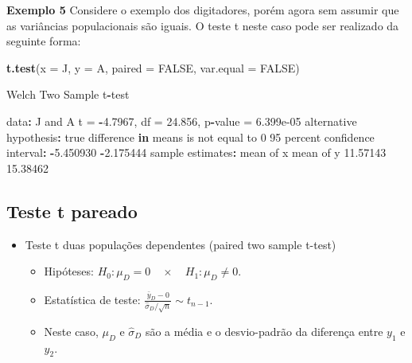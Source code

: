 \documentclass[10pt,a4paper]{book}
\newenvironment{Shaded}{\begin{snugshade}}{\end{snugshade}}
\newcommand{\KeywordTok}[1]{\textcolor[rgb]{0.13,0.29,0.53}{\textbf{#1}}}
\newcommand{\DataTypeTok}[1]{\textcolor[rgb]{0.13,0.29,0.53}{#1}}
\newcommand{\DecValTok}[1]{\textcolor[rgb]{0.00,0.00,0.81}{#1}}
\newcommand{\FloatTok}[1]{\textcolor[rgb]{0.00,0.00,0.81}{#1}}
\newcommand{\StringTok}[1]{\textcolor[rgb]{0.31,0.60,0.02}{#1}}
\newcommand{\OtherTok}[1]{\textcolor[rgb]{0.56,0.35,0.01}{#1}}
\newcommand{\ControlFlowTok}[1]{\textcolor[rgb]{0.13,0.29,0.53}{\textbf{#1}}}
\newcommand{\OperatorTok}[1]{\textcolor[rgb]{0.81,0.36,0.00}{\textbf{#1}}}
\newcommand{\NormalTok}[1]{#1}
\providecommand{\tightlist}{%
  \setlength{\itemsep}{0pt}\setlength{\parskip}{0pt}}
\begin{document}
\textbf{Exemplo 5} Considere o exemplo dos digitadores, porém agora sem
assumir que as variâncias populacionais são iguais. O teste t neste caso
pode ser realizado da seguinte forma:

\begin{Shaded}
\begin{Highlighting}[]
\KeywordTok{t.test}\NormalTok{(}\DataTypeTok{x =}\NormalTok{ J, }\DataTypeTok{y =}\NormalTok{ A, }\DataTypeTok{paired =} \OtherTok{FALSE}\NormalTok{, }\DataTypeTok{var.equal =} \OtherTok{FALSE}\NormalTok{)}

\NormalTok{    Welch Two Sample t}\OperatorTok{-}\NormalTok{test}

\NormalTok{data}\OperatorTok{:}\StringTok{  }\NormalTok{J and A}
\NormalTok{t =}\StringTok{ }\OperatorTok{-}\FloatTok{4.7967}\NormalTok{, df =}\StringTok{ }\FloatTok{24.856}\NormalTok{, p}\OperatorTok{-}\NormalTok{value =}\StringTok{ }\FloatTok{6.399e-05}
\NormalTok{alternative hypothesis}\OperatorTok{:}\StringTok{ }\NormalTok{true difference }\ControlFlowTok{in}\NormalTok{ means is not equal to }\DecValTok{0}
\DecValTok{95}\NormalTok{ percent confidence interval}\OperatorTok{:}
\StringTok{ }\OperatorTok{-}\FloatTok{5.450930} \OperatorTok{-}\FloatTok{2.175444}
\NormalTok{sample estimates}\OperatorTok{:}
\NormalTok{mean of x mean of y }
 \FloatTok{11.57143}  \FloatTok{15.38462} 
\end{Highlighting}
\end{Shaded}

\subsection{Teste t pareado}\label{teste-t-pareado}

\begin{itemize}
\tightlist
\item
  Teste t duas populações dependentes (paired two sample t-test)

  \begin{itemize}
  \tightlist
  \item
    Hipóteses: \(H_0: \mu_D = 0 \quad \times \quad H_1: \mu_D \neq 0.\)
  \item
    Estatística de teste:
    \(\frac{\bar{y}_D - 0}{\hat{\sigma}_D/\sqrt{n}} \sim t_{n-1}.\)
  \item
    Neste caso, \(\mu_D\) e \(\hat{\sigma}_D\) são a média e o
    desvio-padrão da diferença entre \(y_1\) e \(y_2\).
  \end{itemize}
\end{itemize}
\end{document}
